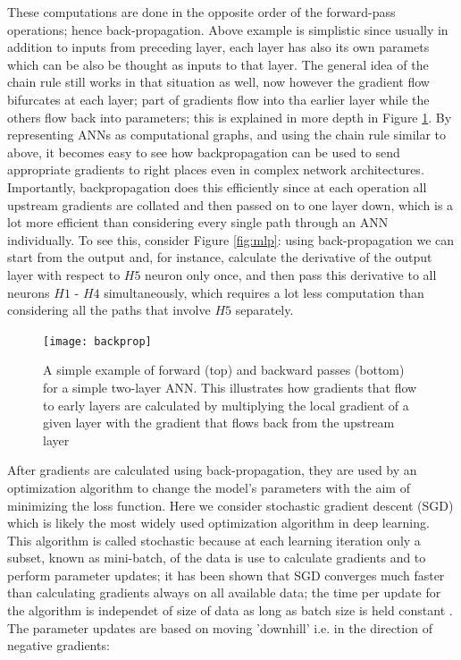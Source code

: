 \documentclass[12pt]{report}
\begin{document}
These computations are done in the opposite order of the forward-pass operations; hence back-propagation. Above example is simplistic since usually in addition to inputs from preceding layer, each layer has also its own paramets which can be also be thought as inputs to that layer. The general idea of the chain rule still works in that situation as well, now however the gradient flow bifurcates at each layer; part of gradients flow into tha earlier layer while the others flow back into parameters; this is explained in more depth in Figure \ref{fig:backprop}. By representing ANNs as computational graphs, and using the chain rule similar to above, it becomes easy to see how backpropagation can be used to send appropriate gradients to right places even in complex network architectures. Importantly, backpropagation does this efficiently since at each operation all upstream gradients are collated and then passed on to one layer down, which is a lot more efficient than considering every single path through an ANN individually. To see this, consider Figure \ref{fig:mlp}: using back-propagation we can start from the output and, for instance, calculate the derivative of the output layer with respect to $H5$ neuron only once, and then pass this derivative to all neurons $H1$ - $H4$ simultaneously, which requires a lot less computation than considering all the paths that involve $H5$ separately. 

\begin{figure}
  \centering
	\texttt{[image: backprop]}
	\caption{A simple example of forward (top) and backward passes (bottom) for a simple two-layer ANN. This illustrates how gradients that flow to early layers are calculated by multiplying the local gradient of a given layer with the gradient that flows back from the upstream layer}
	\label{fig:backprop}
\end{figure}

After gradients are calculated using back-propagation, they are used by an optimization algorithm to change the model's parameters with the aim of minimizing the loss function. Here we consider stochastic gradient descent (SGD) \cite{Robbins1951} which is likely the most widely used optimization algorithm in deep learning. This algorithm is called stochastic because at each learning iteration only a subset, known as mini-batch, of the data is use to calculate gradients and to perform parameter updates; it has been shown that SGD converges much faster than calculating gradients always on all available data; the time per update for the algorithm is independet of size of data as long as batch size is held constant \cite{Goodfellow2016}. The parameter updates are based on moving 'downhill' i.e. in the direction of negative gradients:
\end{document}
